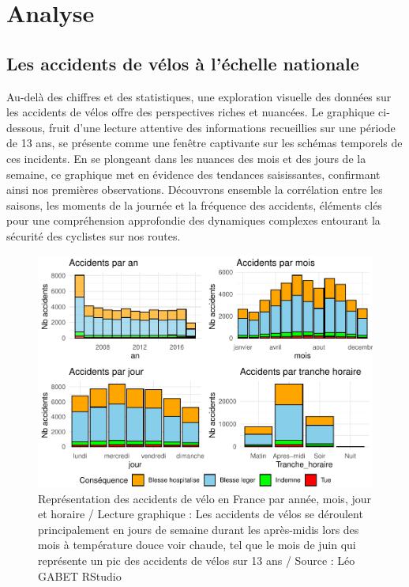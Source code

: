 \documentclass[french,]{compterendu}
\theoremstyle{urcastyle}
\theoremstyle{remark}
\begin{document}
\hypertarget{analyse}{%
\section{Analyse}\label{analyse}}

\hypertarget{les-accidents-de-vuxe9los-uxe0-luxe9chelle-nationale}{%
\subsection{Les accidents de vélos à l'échelle nationale}\label{les-accidents-de-vuxe9los-uxe0-luxe9chelle-nationale}}

Au-delà des chiffres et des statistiques, une exploration visuelle des données sur les accidents de vélos offre des perspectives riches et nuancées. Le graphique ci-dessous, fruit d'une lecture attentive des informations recueillies sur une période de 13 ans, se présente comme une fenêtre captivante sur les schémas temporels de ces incidents. En se plongeant dans les nuances des mois et des jours de la semaine, ce graphique met en évidence des tendances saisissantes, confirmant ainsi nos premières observations. Découvrons ensemble la corrélation entre les saisons, les moments de la journée et la fréquence des accidents, éléments clés pour une compréhension approfondie des dynamiques complexes entourant la sécurité des cyclistes sur nos routes.

\begin{figure}[H]

{\centering \includegraphics[width=0.9\linewidth]{Rapport_ADD_LEO-GABET_files/figure-latex/accfrancedetail-1} 

}

\caption{Représentation des accidents de vélo en France par année, mois, jour et horaire / Lecture graphique : Les accidents de vélos se déroulent principalement en jours de semaine durant les après-midis lors des mois à température douce voir chaude, tel que le mois de juin qui représente un pic des accidents de vélos sur 13 ans / Source : Léo GABET RStudio}\label{fig:accfrancedetail}
\end{figure}
\end{document}
